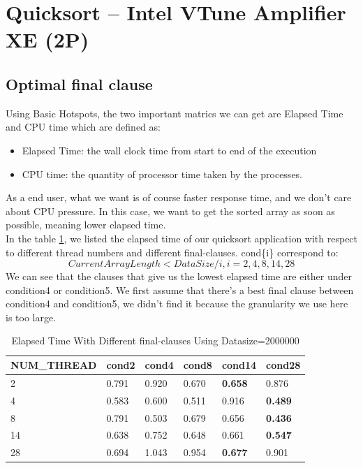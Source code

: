 \documentclass[article]{scrartcl}
\begin{document}
\maketitle
\thispagestyle{fancy}

\section{ Quicksort – Intel VTune Amplifier XE (2P)}
\subsection{Optimal final clause}
Using Basic Hotspots, the two important matrics we can get are Elapsed Time and CPU time which are defined as:
\begin{itemize}
    \item Elapsed Time: the wall clock time from start to end of the execution
    \item CPU time: the quantity of processor time taken by the processes.
\end{itemize}
As a end user, what we want is of course faster response time, and we don't care about CPU pressure. In this case, we want to get the sorted array as soon as possible, meaning lower elapsed time.\\
In the table \ref{tab::final}, we listed the elapsed time of our quicksort application with respect to different thread numbers and different final-clauses.
cond\{i\} correspond to:
$$CurrentArrayLength < DataSize / i, i = 2,4,8,14,28$$
We can see that the clauses that give us the lowest elapsed time are either under condition4 or condition5. We first assume that there's a best final clause between condition4 and condition5, we didn't find it because the granularity we use here is too large.
\begin{table}[h!]
    \centering
  \begin{tabular}{ |p{3cm}|p{1cm}|p{1cm}|p{1cm}|p{1cm}|p{1cm}|  }
    \hline
    NUM\_THREAD & cond2 & cond4 & cond8 & cond14 & cond28\\
     \hline
     2&0.791&0.920&0.670&\textbf{0.658}&0.876\\
     \hline
     4 & 0.583&0.600&0.511&0.916&\textbf{0.489}\\
    \hline
    8 &0.791&0.503&0.679&0.656&\textbf{0.436}\\
    \hline
    14 & 0.638&0.752&0.648&0.661&\textbf{0.547}\\
   \hline
   28 &0.694&1.043&0.954&\textbf{0.677}&0.901\\
    \hline
    \end{tabular}
    \caption{Elapsed Time With Different final-clauses Using Datasize=2000000}
    \label{tab::final}
\end{table}
\end{document}
